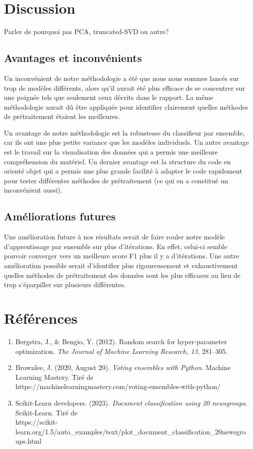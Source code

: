 \documentclass{article}
\begin{document}
\section{Discussion}
Parler de pourquoi pas PCA, truncated-SVD ou autre?
\subsection{Avantages et inconvénients}
Un inconvénient de notre méthodologie a été que nous nous sommes lancés sur trop de modèles différents, alors qu'il aurait été plus efficace de se concentrer sur une poignée tels que seulement ceux décrits dans le rapport. La même méthodologie aurait dû être appliquée pour identifier clairement quelles méthodes de prétraitement étaient les meilleures.

Un avantage de notre méthodologie est la robustesse du classifieur par ensemble, car ils ont une plus petite variance que les modèles individuels. Un autre avantage est le travail sur la visualisation des données qui a permis une meilleure compréhension du matériel. Un dernier avantage est la structure du code en orienté objet qui a permis une plus grande facilité à adapter le code rapidement pour tester différentes méthodes de prétraitement (ce qui en a constitué un inconvénient aussi).

\subsection{Améliorations futures}
Une amélioration future à nos résultats serait de faire rouler notre modèle d'apprentissage par ensemble sur plus d'itérations. En effet, celui-ci semble pouvoir converger vers un meilleure score F1 plus il y a d'itérations. Une autre amélioration possible serait d'identifier plus rigoureusement et exhaustivement quelles méthodes de prétraitement des données sont les plus efficaces au lieu de trop s'éparpiller sur plusieurs différentes.

\newpage
\section{Références}
\begin{enumerate}
    \item \label{bergstra2012random} Bergstra, J., \& Bengio, Y. (2012). Random search for hyper-parameter optimization. \textit{The Journal of Machine Learning Research, 13}, 281–305.
    \item Brownlee, J. (2020, August 20). \textit{Voting ensembles with Python}. Machine Learning Mastery. Tiré de \\    https://machinelearningmastery.com/voting-ensembles-with-python/
    \item Scikit-Learn developers. (2023). \textit{Document classification using 20 newsgroups}. Scikit-Learn. Tiré de \\ https://scikit-learn.org/1.5/auto\_examples/text/plot\_document\_classification\_20newsgroups.html

\end{enumerate}
\end{document}
